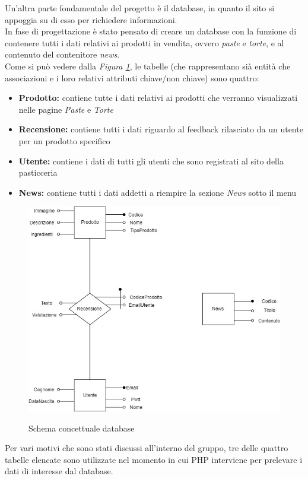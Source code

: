 Un'altra parte fondamentale del progetto è il database, in quanto il sito si appoggia su di esso per richiedere informazioni.\\ 
In fase di progettazione è stato pensato di creare un database con la funzione di contenere tutti i dati relativi ai prodotti in vendita, ovvero \emph{paste} e \emph{torte}, e al contenuto del contenitore \emph{news}.\\
Come si può vedere dalla \emph{Figura \ref{Fig:schemadb}}, le tabelle (che rappresentano sià entità che associazioni e i loro relativi attributi chiave/non chiave) sono quattro:
\begin{itemize}
		\item \textbf{Prodotto:} contiene tutte i dati relativi ai prodotti che verranno visualizzati nelle pagine \emph{Paste} e \emph{Torte}
		\item \textbf{Recensione:} contiene tutti i dati riguardo al feedback rilasciato da un utente per un prodotto specifico
		\item \textbf{Utente:} contiene i dati di tutti gli utenti che sono registrati al sito della pasticceria
		\item \textbf{News:} contiene tutti i dati addetti a riempire la sezione \emph{News} sotto il menu 
\end{itemize}
\begin{figure}[!h]
	\centering
	\includegraphics[width=0.7\linewidth]{sezioni/Progettazione/Immagini/schema_concettuale.jpg}\\
    \caption{Schema concettuale database}
	\label{Fig:schemadb}
\end{figure}
Per vari motivi che sono stati discussi all'interno del gruppo, tre delle quattro tabelle elencate sono utilizzate nel momento in cui PHP interviene per prelevare i dati di interesse dal database.\\

